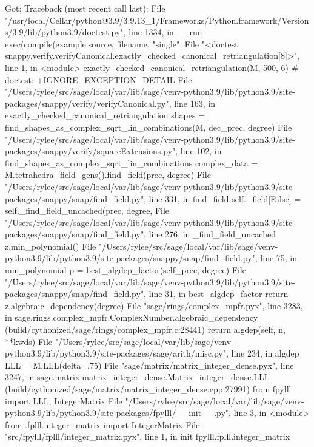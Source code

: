 Got:
    Traceback (most recent call last):
      File "/usr/local/Cellar/python@3.9/3.9.13_1/Frameworks/Python.framework/Versions/3.9/lib/python3.9/doctest.py", line 1334, in __run
        exec(compile(example.source, filename, "single",
      File "<doctest snappy.verify.verifyCanonical.exactly_checked_canonical_retriangulation[8]>", line 1, in <module>
        exactly_checked_canonical_retriangulation(M, 500, 6)  # doctest: +IGNORE_EXCEPTION_DETAIL
      File "/Users/rylee/src/sage/local/var/lib/sage/venv-python3.9/lib/python3.9/site-packages/snappy/verify/verifyCanonical.py", line 163, in exactly_checked_canonical_retriangulation
        shapes = find_shapes_as_complex_sqrt_lin_combinations(M, dec_prec, degree)
      File "/Users/rylee/src/sage/local/var/lib/sage/venv-python3.9/lib/python3.9/site-packages/snappy/verify/squareExtensions.py", line 102, in find_shapes_as_complex_sqrt_lin_combinations
        complex_data = M.tetrahedra_field_gens().find_field(prec, degree)
      File "/Users/rylee/src/sage/local/var/lib/sage/venv-python3.9/lib/python3.9/site-packages/snappy/snap/find_field.py", line 331, in find_field
        self._field[False] = self._find_field_uncached(prec, degree,
      File "/Users/rylee/src/sage/local/var/lib/sage/venv-python3.9/lib/python3.9/site-packages/snappy/snap/find_field.py", line 276, in _find_field_uncached
        z.min_polynomial()
      File "/Users/rylee/src/sage/local/var/lib/sage/venv-python3.9/lib/python3.9/site-packages/snappy/snap/find_field.py", line 75, in min_polynomial
        p = best_algdep_factor(self_prec, degree)
      File "/Users/rylee/src/sage/local/var/lib/sage/venv-python3.9/lib/python3.9/site-packages/snappy/snap/find_field.py", line 31, in best_algdep_factor
        return z.algebraic_dependency(degree)
      File "sage/rings/complex_mpfr.pyx", line 3283, in sage.rings.complex_mpfr.ComplexNumber.algebraic_dependency (build/cythonized/sage/rings/complex_mpfr.c:28441)
        return algdep(self, n, **kwds)
      File "/Users/rylee/src/sage/local/var/lib/sage/venv-python3.9/lib/python3.9/site-packages/sage/arith/misc.py", line 234, in algdep
        LLL = M.LLL(delta=.75)
      File "sage/matrix/matrix_integer_dense.pyx", line 3247, in sage.matrix.matrix_integer_dense.Matrix_integer_dense.LLL (build/cythonized/sage/matrix/matrix_integer_dense.cpp:27991)
        from fpylll import LLL, IntegerMatrix
      File "/Users/rylee/src/sage/local/var/lib/sage/venv-python3.9/lib/python3.9/site-packages/fpylll/__init__.py", line 3, in <module>
        from .fplll.integer_matrix import IntegerMatrix
      File "src/fpylll/fplll/integer_matrix.pyx", line 1, in init fpylll.fplll.integer_matrix
